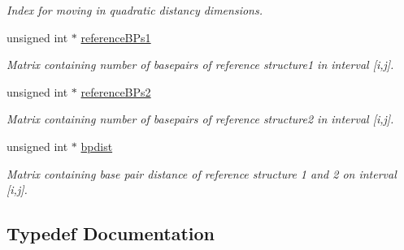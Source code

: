 \begin{DoxyCompactItemize}
\begin{DoxyCompactList}\small\item\em Index for moving in quadratic distancy dimensions. \end{DoxyCompactList}\item 
\hypertarget{group__kl__neighborhood__mfe_a536525b98c1b633d4c5f2da4f8d78c18}{}unsigned int $\ast$ \hyperlink{group__kl__neighborhood__mfe_a536525b98c1b633d4c5f2da4f8d78c18}{reference\+B\+Ps1}\label{group__kl__neighborhood__mfe_a536525b98c1b633d4c5f2da4f8d78c18}

\begin{DoxyCompactList}\small\item\em Matrix containing number of basepairs of reference structure1 in interval \mbox{[}i,j\mbox{]}. \end{DoxyCompactList}\item 
\hypertarget{group__kl__neighborhood__mfe_aa7abf73c3114cb5f0dc90e702fa9dd0f}{}unsigned int $\ast$ \hyperlink{group__kl__neighborhood__mfe_aa7abf73c3114cb5f0dc90e702fa9dd0f}{reference\+B\+Ps2}\label{group__kl__neighborhood__mfe_aa7abf73c3114cb5f0dc90e702fa9dd0f}

\begin{DoxyCompactList}\small\item\em Matrix containing number of basepairs of reference structure2 in interval \mbox{[}i,j\mbox{]}. \end{DoxyCompactList}\item 
\hypertarget{group__kl__neighborhood__mfe_af1106e1a592e2dccc92b3452340549e0}{}unsigned int $\ast$ \hyperlink{group__kl__neighborhood__mfe_af1106e1a592e2dccc92b3452340549e0}{bpdist}\label{group__kl__neighborhood__mfe_af1106e1a592e2dccc92b3452340549e0}

\begin{DoxyCompactList}\small\item\em Matrix containing base pair distance of reference structure 1 and 2 on interval \mbox{[}i,j\mbox{]}. \end{DoxyCompactList}\end{DoxyCompactItemize}


\subsection{Typedef Documentation}
\hypertarget{group__kl__neighborhood__mfe_ga6a81a58268d250309712549a3fa0aab2}{}
